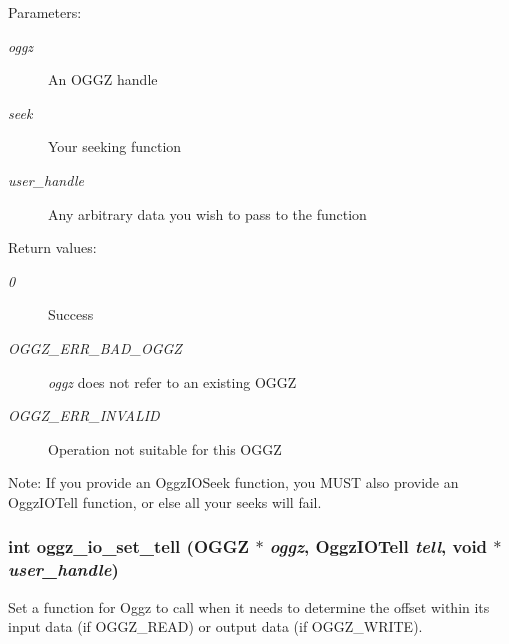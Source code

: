 \begin{Desc}
\item[Parameters:]
\begin{description}
\item[{\em oggz}]An OGGZ handle \item[{\em seek}]Your seeking function \item[{\em user\_\-handle}]Any arbitrary data you wish to pass to the function \end{description}
\end{Desc}
\begin{Desc}
\item[Return values:]
\begin{description}
\item[{\em 0}]Success \item[{\em OGGZ\_\-ERR\_\-BAD\_\-OGGZ}]{\em oggz\/} does not refer to an existing OGGZ \item[{\em OGGZ\_\-ERR\_\-INVALID}]Operation not suitable for this OGGZ\end{description}
\end{Desc}
\begin{Desc}
\item[Note:]If you provide an Oggz\-IOSeek function, you MUST also provide an Oggz\-IOTell function, or else all your seeks will fail. \end{Desc}
\subsubsection{\setlength{\rightskip}{0pt plus 5cm}int oggz\_\-io\_\-set\_\-tell ({\bf OGGZ} $\ast$ {\em oggz}, {\bf Oggz\-IOTell} {\em tell}, void $\ast$ {\em user\_\-handle})}\label{oggz__io_8h_a11}


Set a function for Oggz to call when it needs to determine the offset within its input data (if OGGZ\_\-READ) or output data (if OGGZ\_\-WRITE). 

